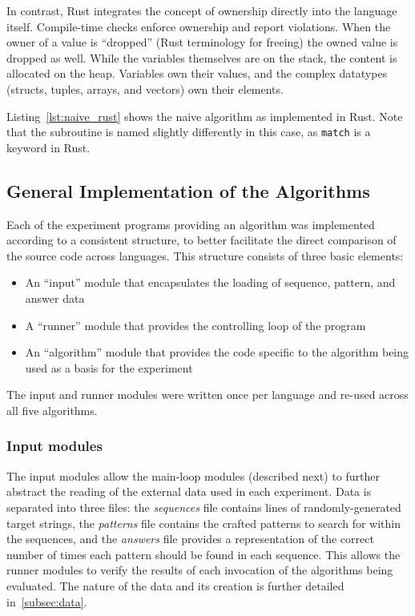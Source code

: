 In contrast, Rust integrates the concept of ownership directly into the language itself. Compile-time checks enforce ownership and report violations. When the owner of a value is ``dropped'' (Rust terminology for freeing) the owned value is dropped as well. While the variables themselves are on the stack, the content is allocated on the heap. Variables own their values, and the complex datatypes (structs, tuples, arrays, and vectors) own their elements.

Listing~\ref{lst:naive_rust} shows the naive algorithm as implemented in Rust. Note that the subroutine is named slightly differently in this case, as \texttt{match} is a keyword in Rust.



\subsection{General Implementation of the Algorithms}

Each of the experiment programs providing an algorithm was implemented according to a consistent structure, to better facilitate the direct comparison of the source code across languages. This structure consists of three basic elements:

\begin{itemize}
\item An ``input'' module that encapsulates the loading of sequence, pattern, and answer data
\item A ``runner'' module that provides the controlling loop of the program
\item An ``algorithm'' module that provides the code specific to the algorithm being used as a basis for the experiment
\end{itemize}

The input and runner modules were written once per language and re-used across all five algorithms.

\subsubsection{Input modules}

The input modules allow the main-loop modules (described next) to further abstract the reading of the external data used in each experiment. Data is separated into three files: the \textit{sequences} file contains lines of randomly-generated target strings, the \textit{patterns} file contains the crafted patterns to search for within the sequences, and the \textit{answers} file provides a representation of the correct number of times each pattern should be found in each sequence. This allows the runner modules to verify the results of each invocation of the algorithms being evaluated. The nature of the data and its creation is further detailed in~\ref{subsec:data}.

